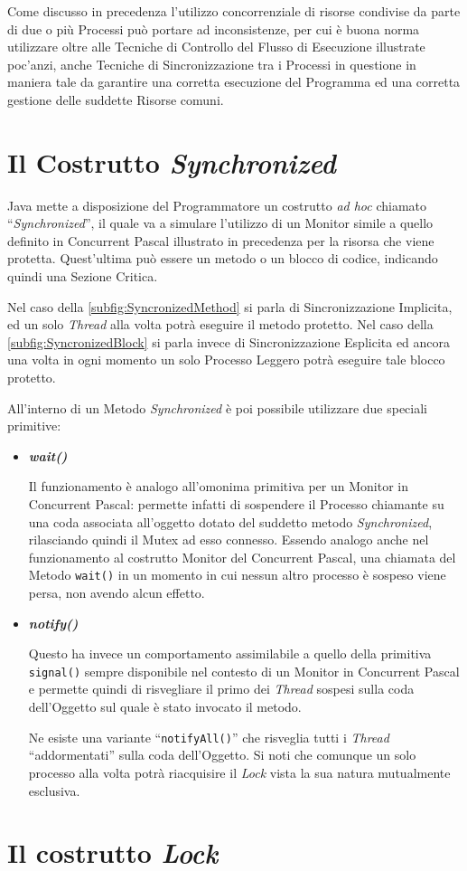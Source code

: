 Come discusso in precedenza l'utilizzo concorrenziale di risorse condivise da parte di due o più Processi può portare ad inconsistenze, per cui è buona norma utilizzare oltre alle Tecniche di Controllo del Flusso di Esecuzione illustrate poc'anzi, anche Tecniche di Sincronizzazione tra i Processi in questione in maniera tale da garantire una corretta esecuzione del Programma ed una corretta gestione delle suddette Risorse comuni. \par
\section{Il Costrutto \textit{Synchronized}}
Java mette a disposizione del Programmatore un costrutto \textit{ad hoc} chiamato ``\textit{Synchronized}'', il quale va a simulare l'utilizzo di un Monitor simile a quello definito in Concurrent Pascal illustrato in precedenza per la risorsa che viene protetta. Quest'ultima può essere un metodo o un blocco di codice, indicando quindi una Sezione Critica.

Nel caso della \autoref{subfig:SyncronizedMethod} si parla di Sincronizzazione Implicita, ed un solo \textit{Thread} alla volta potrà eseguire il metodo protetto. Nel caso della \autoref{subfig:SyncronizedBlock} si parla invece di Sincronizzazione Esplicita ed ancora una volta in ogni momento un solo Processo Leggero potrà eseguire tale blocco protetto. \par
All'interno di un Metodo \textit{Synchronized} è poi possibile utilizzare due speciali primitive:
\begin{itemize}
    \item \textbf{\textit{wait()}} \par
    Il funzionamento è analogo all'omonima primitiva per un Monitor in Concurrent Pascal: permette infatti di sospendere il Processo chiamante su una coda associata all'oggetto dotato del suddetto metodo \textit{Synchronized}, rilasciando quindi il Mutex ad esso connesso. Essendo analogo anche nel funzionamento al costrutto Monitor del Concurrent Pascal, una chiamata del Metodo \texttt{wait()} in un momento in cui nessun altro processo è sospeso viene persa, non avendo alcun effetto. 
    \item \textbf{\textit{notify()}} \par
    Questo ha invece un comportamento assimilabile a quello della primitiva \texttt{signal()} sempre disponibile nel contesto di un Monitor in Concurrent Pascal e permette quindi di risvegliare il primo dei \textit{Thread} sospesi sulla coda dell'Oggetto sul quale è stato invocato il metodo. \par
    Ne esiste una variante ``\texttt{notifyAll()}'' che risveglia tutti i \textit{Thread} ``addormentati'' sulla coda dell'Oggetto. Si noti che comunque un solo processo alla volta potrà riacquisire il \textit{Lock} vista la sua natura mutualmente esclusiva.
\end{itemize}
\section{Il costrutto \textit{Lock}}